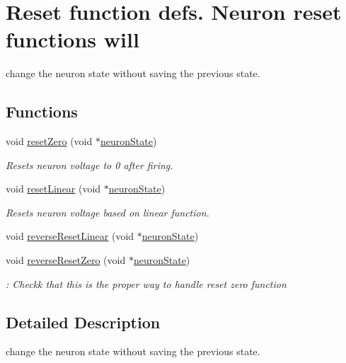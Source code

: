 \hypertarget{group___reset_functions}{}\section{Reset function defs. Neuron reset functions will}
\label{group___reset_functions}


change the neuron state without saving the previous state.  


\subsection*{Functions}
\begin{DoxyCompactItemize}
\item 
void \hyperlink{group___reset_functions_ga7f8eaa35f03747c795a2b727b364537b}{reset\+Zero} (void $\ast$\hyperlink{structneuron_state}{neuron\+State})
\begin{DoxyCompactList}\small\item\em Resets neuron voltage to 0 after firing. \end{DoxyCompactList}\item 
void \hyperlink{group___reset_functions_ga2e78d7d2b70bf7349c3854b3727dcc25}{reset\+Linear} (void $\ast$\hyperlink{structneuron_state}{neuron\+State})
\begin{DoxyCompactList}\small\item\em Resets neuron voltage based on linear function. \end{DoxyCompactList}\item 
void \hyperlink{group___reset_functions_ga09e54832158e2f6abe898437979aae00}{reverse\+Reset\+Linear} (void $\ast$\hyperlink{structneuron_state}{neuron\+State})
\item 
void \hyperlink{group___reset_functions_gae53276ccdb759ba1ea09806cbf9fc940}{reverse\+Reset\+Zero} (void $\ast$\hyperlink{structneuron_state}{neuron\+State})
\begin{DoxyCompactList}\small\item\em \+: Checkk that this is the proper way to handle reset zero function \end{DoxyCompactList}\end{DoxyCompactItemize}


\subsection{Detailed Description}
change the neuron state without saving the previous state. 

